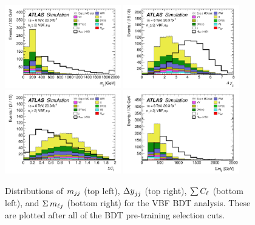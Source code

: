 \begin{figure}[h!]
  \centering
  \captionsetup{justification=centering}
  \includegraphics[width=0.45\textwidth]{figures/BDT_mjj}
  \includegraphics[width=0.45\textwidth]{figures/BDT_dyjj}
  \includegraphics[width=0.45\textwidth]{figures/BDT_olv}
  \includegraphics[width=0.45\textwidth]{figures/BDT_mlj}
  \caption{Distributions of $m_{jj}$ (top left), $\dyjj$ (top right), $\sum C_{\ell}$ (bottom left), and $\Sigma\,m_{\ell j}$ (bottom right) for the VBF BDT analysis. These are plotted after all of the BDT pre-training selection cuts\cite{WW2015}.}
  \label{fig:vbf_bdt_vbftopo}
\end{figure}




